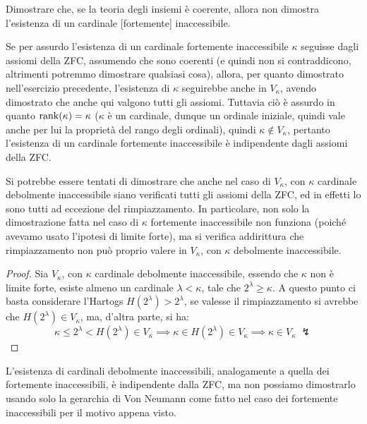 \begin{exercise}
	Dimostrare che, se la teoria degli insiemi \`e coerente, allora non dimostra l'esistenza di un cardinale [fortemente] inaccessibile.
\end{exercise}

\begin{soln}
	Se per assurdo l'esistenza di un cardinale fortemente inaccessibile $\kappa$ seguisse dagli assiomi della ZFC, assumendo che sono coerenti (e quindi non si contraddicono, altrimenti potremmo dimostrare qualsiasi cosa), allora,
	per quanto dimostrato nell'esercizio precedente, l'esistenza di $\kappa$ seguirebbe anche in $V_\kappa$, avendo dimostrato che anche qui valgono tutti gli assiomi. Tuttavia ci\`o \`e assurdo in quanto $\operatorname{rank}(\kappa) = \kappa$ ($\kappa$ \`e un cardinale, dunque un ordinale iniziale, quindi vale anche per lui la propriet\`a del rango degli ordinali), quindi 
	$\kappa \not \in V_\kappa$, pertanto l'esistenza di un cardinale fortemente inaccessibile \`e indipendente dagli assiomi della ZFC.
\end{soln}

\begin{remark}
	Si potrebbe essere tentati di dimostrare che anche nel caso di $V_\kappa$, con $\kappa$ cardinale debolmente inaccessibile siano verificati tutti gli assiomi della ZFC, ed in effetti lo sono tutti ad eccezione del rimpiazzamento. In particolare, non solo la dimostrazione fatta nel caso di $\kappa$ fortemente inaccessibile non funziona (poich\'e avevamo usato l'ipotesi di limite forte),
	ma si verifica addirittura che rimpiazzamento non pu\`o proprio valere in $V_\kappa$, con $\kappa$ debolmente inaccessibile.
\end{remark}

\begin{proof}
	Sia $V_{\kappa}$, con $\kappa$ cardinale debolmente inaccessibile, essendo che $\kappa$ non \`e limite forte, esiste almeno un cardinale $\lambda < \kappa$, tale che $2^{\lambda} \geq \kappa$. A questo punto 
	ci basta considerare l'Hartogs $H(2^{\lambda}) > 2^{\lambda}$, se valesse il rimpiazzamento si avrebbe che $H(2^{\lambda}) \in V_{\kappa}$, ma, d'altra parte, si ha:
	\[ \kappa \leq 2^{\lambda} < H(2^\lambda) \in V_{\kappa} \implies \kappa \in H(2^\lambda) \in V_{\kappa} \implies \kappa \in V_{\kappa} \; \lightning
		\]
\end{proof}

\begin{remark}
	L'esistenza di cardinali debolmente inaccessibili, analogamente a quella dei fortemente inaccessibili, \`e indipendente dalla ZFC, ma non possiamo dimostrarlo usando solo la gerarchia di Von Neumann come fatto nel caso dei fortemente inaccessibili per il motivo appena visto.
\end{remark}
